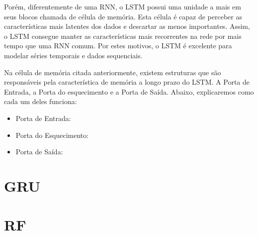 
Porém, diferentemente de uma \acrshort{RNN}, o LSTM possui uma unidade a mais em seus blocos chamada de célula de memória. Esta célula é capaz de perceber as características mais latentes dos dados e descartar as menos importantes. Assim, o \acrshort{LSTM} consegue manter as características mais recorrentes na rede por mais tempo que uma \acrshort{RNN} comum. Por estes motivos, o \acrshort{LSTM} é excelente para modelar séries temporais e dados sequenciais.

Na célula de memória citada anteriormente, existem estruturas que são responsáveis pela característica de memória a longo prazo do \acrshort{LSTM}. A Porta de Entrada, a Porta do esquecimento e a Porta de Saída. Abaixo, explicaremos como cada um deles funciona:

\begin{itemize}
  \item Porta de Entrada: 
  
  \item Porta do Esquecimento: 
  \item Porta de Saída:
\end{itemize}


\section{\acrfull{GRU}}

\section{\acrfull{RF}}





